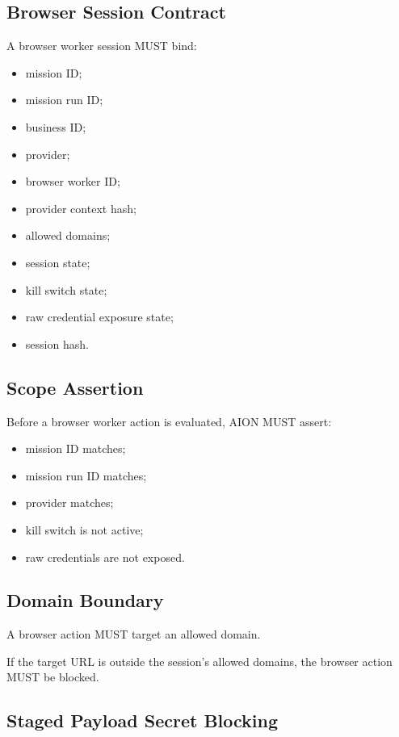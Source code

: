\subsection{Browser Session Contract}

A browser worker session MUST bind:

\begin{itemize}
  \item mission ID;
  \item mission run ID;
  \item business ID;
  \item provider;
  \item browser worker ID;
  \item provider context hash;
  \item allowed domains;
  \item session state;
  \item kill switch state;
  \item raw credential exposure state;
  \item session hash.
\end{itemize}

\subsection{Scope Assertion}

Before a browser worker action is evaluated, AION MUST assert:

\begin{itemize}
  \item mission ID matches;
  \item mission run ID matches;
  \item provider matches;
  \item kill switch is not active;
  \item raw credentials are not exposed.
\end{itemize}

\subsection{Domain Boundary}

A browser action MUST target an allowed domain.

If the target URL is outside the session's allowed domains, the browser action MUST be blocked.

\subsection{Staged Payload Secret Blocking}

